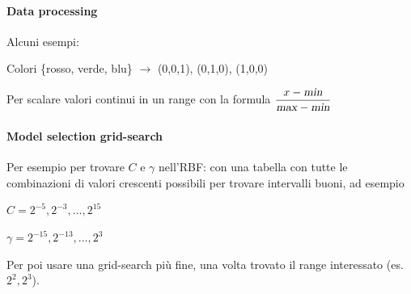 \documentclass[10pt]{book}
\begin{document}
\paragraph{Data processing} Alcuni esempi:
\begin{list}{}{}
	\item Colori \{rosso, verde, blu\} $\rightarrow$ (0,0,1), (0,1,0), (1,0,0)
	\item Per scalare valori continui in un range con la formula $\mathlarger{\frac{x - \textsl{min}}{\textsl{max} - \textsl{min}}}$
\end{list}
\paragraph{Model selection grid-search} Per esempio per trovare $C$ e $\gamma$ nell'RBF: con una tabella con tutte le combinazioni di valori crescenti possibili per trovare intervalli buoni, ad esempio
\begin{list}{}{}
	\item $C = 2^{-5}, 2^{-3},\ldots,2^{15}$
	\item $\gamma = 2^{-15}, 2^{-13},\ldots,2^3$
\end{list}
Per poi usare una grid-search più fine, una volta trovato il range interessato (es. $2^2, 2^3$).
\end{document}
